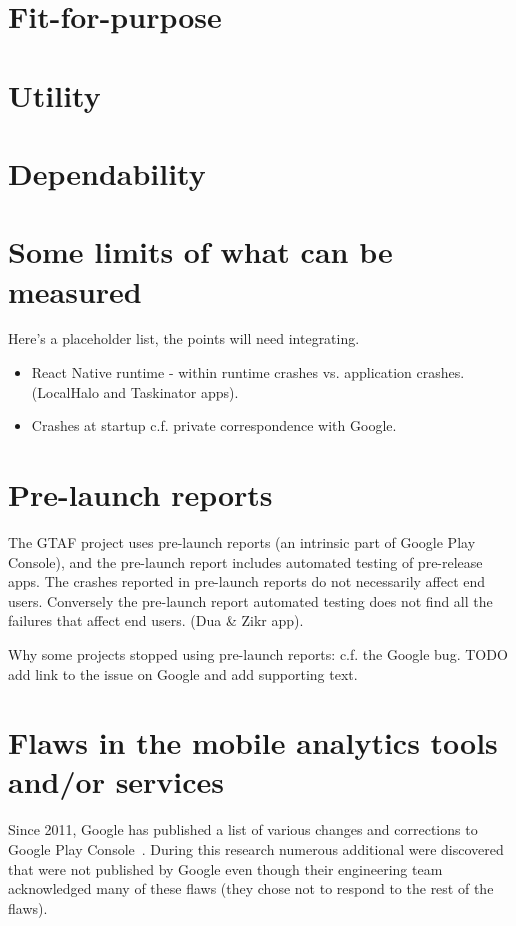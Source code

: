 \section{Fit-for-purpose}


\section{Utility}


\section{Dependability}



\section{Some limits of what can be measured}

Here's a placeholder list, the points will need integrating.
\begin{itemize}
    \item React Native runtime - within runtime crashes vs. application crashes. (LocalHalo and Taskinator apps).
    \item Crashes at startup c.f. private correspondence with Google.
\end{itemize}

\section{Pre-launch reports}
The GTAF project uses pre-launch reports (an intrinsic part of Google Play Console), and the pre-launch report includes automated testing of pre-release apps. The crashes reported in pre-launch reports do not necessarily affect end users. Conversely the pre-launch report automated testing does not find all the failures that affect end users. (Dua \& Zikr app).

Why some projects stopped using pre-launch reports: c.f. the Google bug. TODO add link to the issue on Google and add supporting text.

\section{Flaws in the mobile analytics tools and/or services}

Since 2011, Google has published a list of various changes and corrections to Google Play Console~\citep{google_play_troubleshoot_app_statistics_problems}. During this research numerous additional were discovered that were not published by Google even though their engineering team acknowledged many of these flaws (they chose not to respond to the rest of the flaws). 

